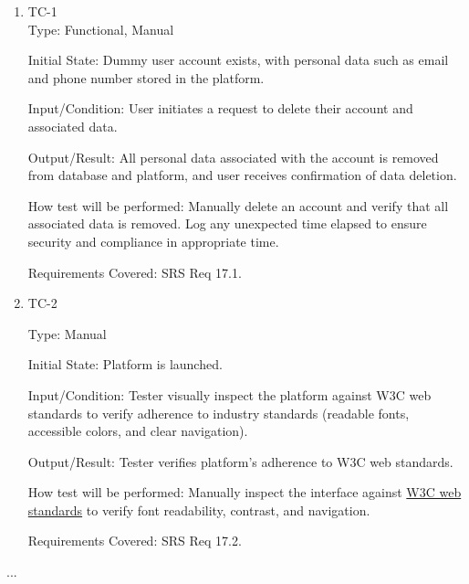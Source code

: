 \documentclass[12pt, titlepage]{article}
\begin{document}
\begin{enumerate}
    \item{TC-1\\}
          Type: Functional, Manual

          Initial State: Dummy user account exists, with personal data such as email and phone number stored in the platform.

          Input/Condition: User initiates a request to delete their account and associated data.

          Output/Result: All personal data associated with the account is removed from database and platform, and user receives confirmation of data deletion.

          How test will be performed: Manually delete an account and verify that all associated data is removed. Log any unexpected time elapsed to ensure security and compliance in appropriate time.

          Requirements Covered: SRS Req 17.1.

    \item{TC-2\\}

          Type: Manual

          Initial State: Platform is launched.

          Input/Condition: Tester visually inspect the platform against W3C web standards to verify adherence to industry standards (readable fonts, accessible colors, and clear navigation).

          Output/Result: Tester verifies platform's adherence to W3C web standards.

          How test will be performed: Manually inspect the interface against \href{https://www.w3.org/standards/}{W3C web standards} to verify font readability, contrast, and navigation.

          Requirements Covered: SRS Req 17.2.
\end{enumerate}

...
\end{document}
